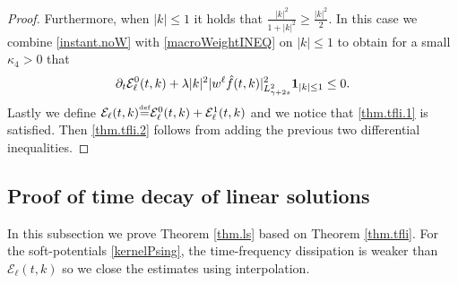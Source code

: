 \documentclass{amsart}
\numberwithin{equation}{section}
\begin{document}
\begin{proof}
Furthermore, when $|k|\le 1$ it holds that
$
\frac{ |k|^2}{1+|k|^2} \ge \frac{|k|^2}{2}.
$
In this case we combine \eqref{instant.noW} with \eqref{macroWeightINEQ}  on $|k|\le 1$ to  obtain for a small $\kappa_4>0$  that
\begin{equation}\notag
\partial_t  \mathcal{E}_{\ell}^0(t,k) 
+ {\lambda} |k|^2 {|} w^{\ell}  \hat{f}(t,k){|}_{L^2_{\gamma + 2s}}^2  { {\mathbf 1}}_{|k|\le 1} 
\le 0.
\end{equation}
Lastly we define 
$
\mathcal{E}_{\ell}(t,k) 
{\overset{\mbox{\tiny{def}}}{=}}
\mathcal{E}_{\ell}^0(t,k) 
+
\mathcal{E}_{\ell}^1(t,k) 
$
and we notice that \eqref{thm.tfli.1} is satisfied.
Then \eqref{thm.tfli.2} follows from adding the previous two differential inequalities.
\end{proof}

\subsection{Proof of time decay of linear solutions}\label{sec.tf}
In this subsection we prove Theorem \ref{thm.ls} based on Theorem \ref{thm.tfli}.
For the soft-potentials \eqref{kernelPsing}, the time-frequency dissipation is weaker than ${\mathcal{E}}_{\ell}(t,k)$ so we close the estimates using interpolation.
\end{document}
